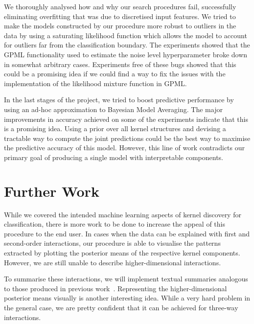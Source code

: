 \documentclass[a4paper,12pt ]{report}
\begin{document}
 We thoroughly analysed how and why our search procedures fail, successfully eliminating overfitting that was due to discretised input features. We tried to make the models constructed by our procedure more robust to outliers in the data by using a saturating likelihood function which allows the model to account for outliers far from the classification boundary. The experiments showed that the GPML functionality used to estimate the noise level hyperparameter broke down in somewhat arbitrary cases. Experiments free of these bugs showed that this could be a promising idea if we could find a way to fix the issues with the implementation of the likelihood mixture function in GPML.

In the last stages of the project, we tried to boost predictive performance by using an ad-hoc approximation to Bayesian Model Averaging. The major improvements in accuracy achieved on some of the experiments indicate that this is a promising idea. Using a prior over all kernel structures and devising a tractable way to compute the joint predictions could be the best way to maximise the predictive accuracy of this model. However, this line of work contradicts our primary goal of producing a single model with interpretable components.


\section{Further Work}

While we covered the intended machine learning aspects of kernel discovery for classification, there is more work to be done to increase the appeal of this procedure to the end user.
 In cases when the data can be explained with first and second-order interactions, our procedure is able to visualise the patterns extracted by plotting the posterior means of the respective kernel components. However, we are still unable to describe higher-dimensional interactions. 
 
 To summarise these interactions, we will implement textual summaries analogous to those produced in previous work~\cite{lloyd14}. Representing the higher-dimensional posterior means visually is another interesting idea. While a very hard problem in the general case, we are pretty confident that it can be achieved for three-way interactions.


\end{document}
